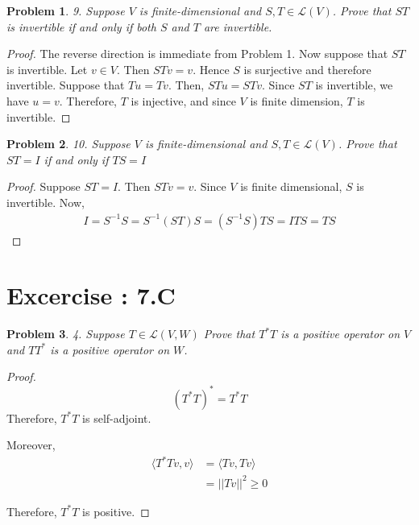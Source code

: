 \documentclass[12pt]{book}
\newtheorem*{problem*}{Problem}
\newcommand{\LL}{\mathcal{L}}
\begin{document}
\begin{problem*}9. Suppose $V$ is finite-dimensional and $S,T \in \LL(V)$. Prove that $ST$ is invertible if and only if both $S$ and $T$ are invertible.\end{problem*}

\begin{proof}
  The reverse direction is immediate from Problem 1. Now suppose that $ST$ is invertible. Let $v \in V$. Then $STv = v$. Hence $S$ is surjective and therefore invertible. Suppose that $Tu = Tv$. Then, $ST u = ST v$. Since $ST$ is invertible, we have $u = v$. Therefore, $T$ is injective, and since $V$ is finite dimension, $T$ is invertible. 
\end{proof}

\begin{problem*}10. Suppose $V$ is finite-dimensional and $S, T \in \LL(V)$. Prove that $ST = I$ if and only if $TS = I$\end{problem*}

\begin{proof}
  Suppose $ST = I$. Then $STv = v$. Since $V$ is finite dimensional, $S$ is invertible. Now,
  \begin{align*}
    I = S^{-1}S = S^{-1}(ST)S = (S^{-1}S)TS = ITS = TS
  \end{align*}
\end{proof}


\section{Excercise : 7.C}

\begin{problem*}
4. Suppose $T \in \LL(V,W)$ Prove that $T^*T$ is a positive operator on $V$ and $TT^*$ is a positive operator on $W$. 
\end{problem*}

\begin{proof}
  \[
  (T^{*}T)^* = T^*T
  \]
  Therefore, $T^{*}T$ is self-adjoint.

  Moreover,
  \begin{align*}
    \langle T^{*}Tv, v \rangle & = \langle Tv, Tv \rangle\\
    & = ||Tv||^2 \ge 0
  \end{align*}

Therefore, $T^{*}T$ is positive. 
\end{proof}

\end{document}
